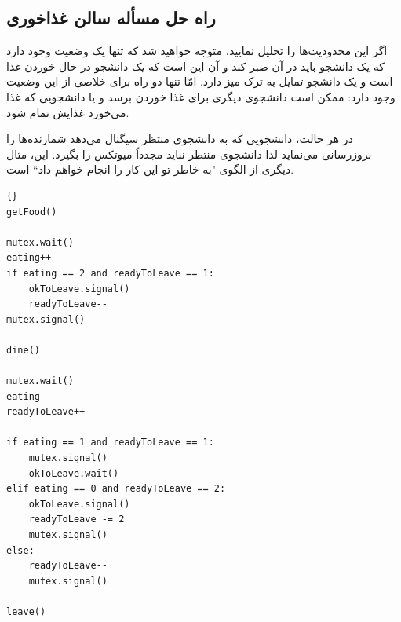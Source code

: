 \documentclass{book}
\newcommand{\clearemptydoublepage}{\newpage\cleardoublepage}
\begin{document}
\clearemptydoublepage
\subsection{راه حل مسأله سالن غذاخوری}

    اگر این محدودیت‌ها را تحلیل نمایید، متوجه خواهید شد که تنها یک وضعیت وجود دارد که یک دانشجو باید در آن صبر کند و آن این است که یک 
    دانشجو در حال خوردن غذا است و یک دانشجو تمایل به ترک میز دارد. امّا تنها دو راه برای خلاصی از این وضعیت وجود دارد:
    ممکن است دانشجوی دیگری برای غذا خوردن برسد و یا دانشجویی که غذا می‌خورد غذایش تمام شود. 

    در هر حالت، دانشجویی که به دانشجوی منتظر سیگنال می‌دهد شمارنده‌ها را بروزرسانی می‌نماید لذا دانشجوی منتظر نباید مجدداً میوتکس را بگیرد. 
    این، مثال دیگری از الگوی "به خاطر تو این کار را انجام خواهم داد`` است.

\begin{latin}
\begin{lstlisting}[title=\rl{راه حل مسأله سالن غذاخوری}]{}
getFood()

mutex.wait()
eating++
if eating == 2 and readyToLeave == 1:
    okToLeave.signal()
    readyToLeave--
mutex.signal()

dine()

mutex.wait()
eating--
readyToLeave++

if eating == 1 and readyToLeave == 1:
    mutex.signal()
    okToLeave.wait()
elif eating == 0 and readyToLeave == 2:
    okToLeave.signal()
    readyToLeave -= 2
    mutex.signal()
else:
    readyToLeave--
    mutex.signal()

leave()
\end{lstlisting}
\end{latin}
\end{document}
